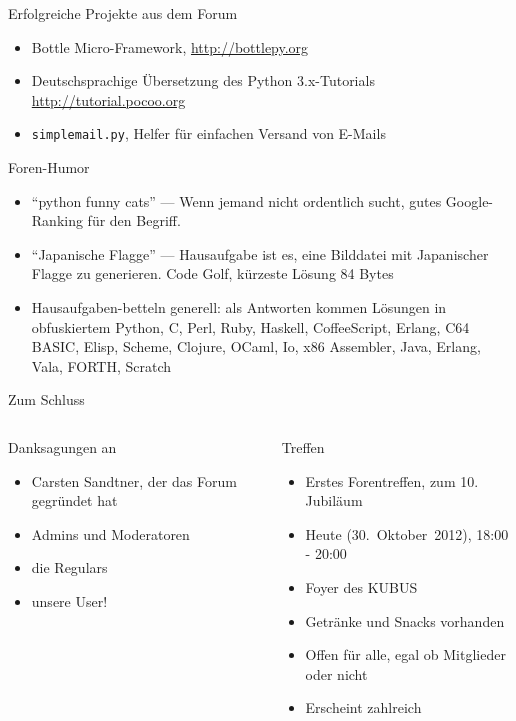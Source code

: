 \documentclass{beamer}
\begin{document}
\begin{frame}{Erfolgreiche Projekte aus dem Forum}
  \begin{itemize}
    \item Bottle Micro-Framework, \url{http://bottlepy.org}
    \item Deutschsprachige Übersetzung des Python 3.x-Tutorials \url{http://tutorial.pocoo.org}
    \item \texttt{simplemail.py}, Helfer für einfachen Versand von E-Mails
  \end{itemize}
\end{frame}

\begin{frame}{Foren-Humor}
  \begin{itemize}
    \item \enquote{python funny cats} — Wenn jemand nicht ordentlich sucht, gutes
      Google-Ranking für den Begriff.
    \item \enquote{Japanische Flagge} — Hausaufgabe ist es, eine Bilddatei mit
      Japanischer Flagge zu generieren. Code Golf, kürzeste Lösung 84 Bytes
    \item Hausaufgaben-betteln generell: als Antworten kommen Lösungen in obfuskiertem
      Python, C, Perl, Ruby, Haskell, CoffeeScript, Erlang, C64 BASIC, Elisp, Scheme,
      Clojure, OCaml, Io, x86 Assembler, Java, Erlang, Vala, FORTH, Scratch
  \end{itemize}
\end{frame}

\begin{frame}{Zum Schluss}
  \begin{columns}[t]
  \begin{block}{Danksagungen an}
    \begin{itemize}
      \item Carsten Sandtner, der das Forum gegründet hat
      \item Admins und Moderatoren
      \item die Regulars
      \item unsere User!
    \end{itemize}
  \end{block}
  \begin{block}{Treffen}
    \begin{itemize}
      \item Erstes Forentreffen, zum 10. Jubiläum
      \item Heute (30.~Oktober~2012), 18:00 - 20:00
      \item Foyer des KUBUS
      \item Getränke und Snacks vorhanden
      \item Offen für alle, egal ob Mitglieder oder nicht
      \item Erscheint zahlreich 
    \end{itemize}
  \end{block}
  \end{columns}
\end{frame}
\end{document}
